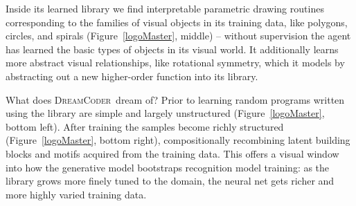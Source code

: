 \documentclass{article}
\newcommand{\system}{\textsc{DreamCoder}~}
\begin{document}
Inside its learned library we find interpretable parametric drawing
routines corresponding to the families of visual objects in its
training data, like polygons, circles, and spirals
(Figure~\ref{logoMaster}, middle) -- without supervision the agent
has learned the basic types of objects in its visual world. It
additionally learns more abstract visual relationships, like
rotational symmetry, which it models by abstracting out a new higher-order
function into its library.

What does \system dream of?  Prior to learning random programs written using the library
are simple and largely unstructured (Figure~\ref{logoMaster}, bottom left).
After training the samples become richly structured
(Figure~\ref{logoMaster}, bottom right), compositionally recombining latent
building blocks and motifs acquired from the training data. This
offers a visual window into how the generative model bootstraps recognition
model training: as the library grows more finely tuned to the domain, the
neural net gets richer and more highly varied training data.
\end{document}

